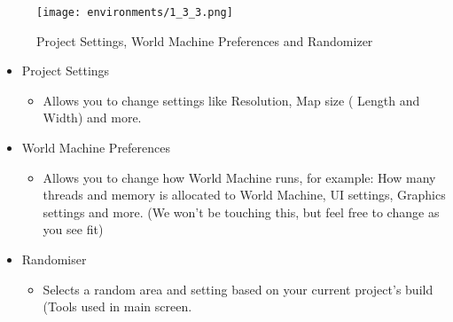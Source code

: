\documentclass[../main.tex]{subfiles}
\begin{document}
\begin{figure}[H]
\texttt{[image: environments/1\_3\_3.png]}
\caption{Project Settings, World Machine Preferences and Randomizer}
\end{figure}
\begin{itemize}
    \item Project Settings
    \begin{itemize}
        \item Allows you to change settings like Resolution, Map size ( Length and Width) and more.
    \end{itemize}
    \item World Machine Preferences
    \begin{itemize}
        \item Allows you to change how World Machine runs, for example: How many threads and memory is allocated to World Machine, UI settings, Graphics settings and more. (We won’t be touching this, but feel free to change as you see fit)
    \end{itemize}
    \item {Randomiser}
    \begin{itemize}
        \item Selects a random area and setting based on your current project’s build (Tools used in main screen.
    \end{itemize}
\end{itemize}
\end{document}
